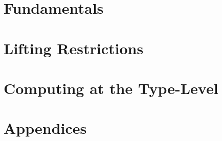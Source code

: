 \documentclass[11pt]{book}
\newcommand{\noglossbaby}[1]{}
\begin{document}
\setlength\emergencystretch{\hsize}

\noglossbaby{}



\tableofcontents




\mainmatter




\part{Fundamentals}








\part{Lifting Restrictions}












\part{Computing at the Type-Level}
















\part{Appendices}


\end{document}
